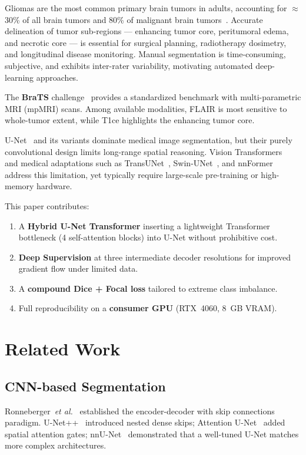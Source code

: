 \documentclass[10pt,twocolumn]{article}
\begin{document}
Gliomas are the most common primary brain tumors in adults, accounting for
$\approx$30\% of all brain tumors and 80\% of malignant brain tumors~\cite{ostrom2020}.
Accurate delineation of tumor sub-regions --- enhancing tumor core, peritumoral edema,
and necrotic core --- is essential for surgical planning, radiotherapy dosimetry, and
longitudinal disease monitoring. Manual segmentation is time-consuming, subjective, and
exhibits inter-rater variability, motivating automated deep-learning approaches.

The \textbf{BraTS} challenge~\cite{menze2015,bakas2017} provides a standardized
benchmark with multi-parametric MRI (mpMRI) scans. Among available modalities, FLAIR is
most sensitive to whole-tumor extent, while T1ce highlights the enhancing tumor core.

U-Net~\cite{ronneberger2015} and its variants dominate medical image segmentation, but
their purely convolutional design limits long-range spatial reasoning. Vision
Transformers~\cite{dosovitskiy2021} and medical adaptations such as
TransUNet~\cite{chen2021}, Swin-UNet~\cite{cao2022}, and nnFormer~\cite{zhou2021}
address this limitation, yet typically require large-scale pre-training or high-memory
hardware.

This paper contributes:
\begin{enumerate}[leftmargin=*, itemsep=1pt, topsep=2pt]
  \item A \textbf{Hybrid U-Net Transformer} inserting a lightweight Transformer
        bottleneck (4 self-attention blocks) into U-Net without prohibitive cost.
  \item \textbf{Deep Supervision} at three intermediate decoder resolutions for improved
        gradient flow under limited data.
  \item A \textbf{compound Dice + Focal loss} tailored to extreme class imbalance.
  \item Full reproducibility on a \textbf{consumer GPU} (RTX~4060, 8~GB VRAM).
\end{enumerate}

\section{Related Work}

\subsection{CNN-based Segmentation}
Ronneberger~\textit{et al.}~\cite{ronneberger2015} established the encoder-decoder
with skip connections paradigm. U-Net++~\cite{zhou2018} introduced nested dense skips;
Attention U-Net~\cite{oktay2018} added spatial attention gates;
nnU-Net~\cite{isensee2021} demonstrated that a well-tuned U-Net matches more complex
architectures.
\end{document}
